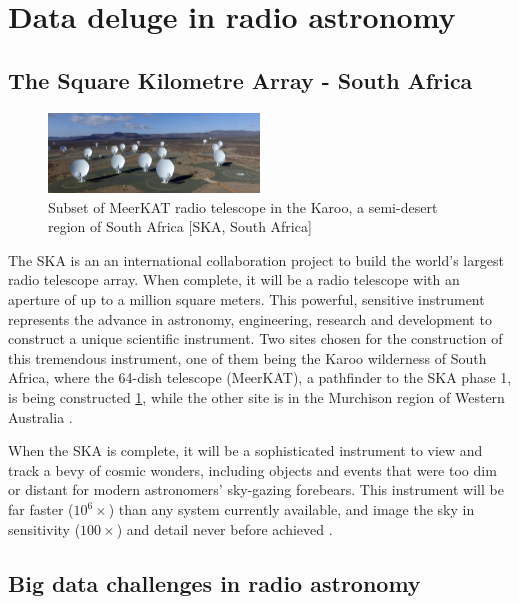 
\section{Data deluge in radio astronomy}
\subsection{The Square Kilometre Array - South Africa}

\begin{figure}[H]
  \centering
    \includegraphics[width=0.5\textwidth]{images/MeerMeer.jpg}
    \caption{Subset of MeerKAT radio telescope in the Karoo, a semi-desert region of South Africa [SKA, South Africa]}
  \label{images/MeerKAT}
\end{figure}

The SKA is an an international collaboration project to build the world's largest radio telescope array. When complete, it will be a radio telescope with an aperture of up to a million square meters. This powerful, sensitive instrument represents the advance in astronomy, engineering, research and  development to construct a unique scientific instrument. Two sites chosen for the construction of this tremendous instrument, one of them being the Karoo wilderness of South Africa, where the 64-dish telescope (MeerKAT), a pathfinder to the SKA phase 1, is being constructed \ref{images/MeerKAT}, while the other site is in the Murchison region of Western Australia \citep{hall2008square}.  

When the SKA is complete, it will be a sophisticated instrument to view and track a bevy of cosmic wonders, including objects and events that were too dim or distant for modern astronomers' sky-gazing forebears. This instrument will be far faster ($10^6\times$) than any system currently available, and image the sky in sensitivity ($100\times$) and detail never before achieved \citep{skatelescope}.

\subsection{Big data challenges in radio astronomy}

